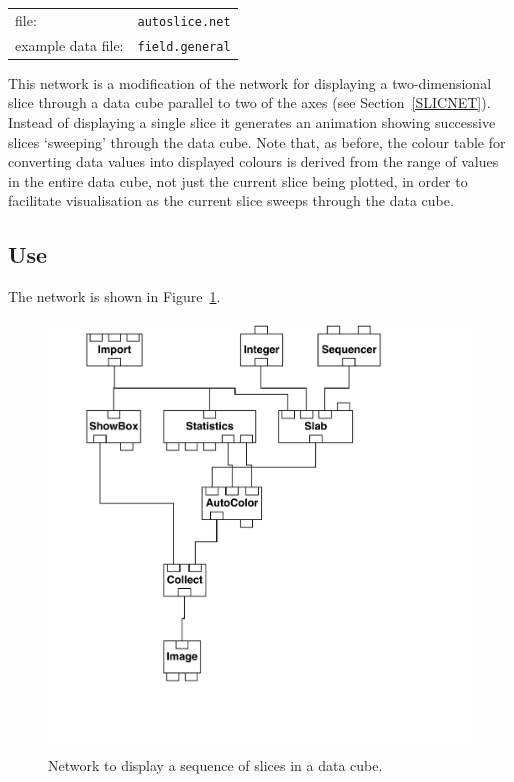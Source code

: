 \documentclass[twoside,11pt]{starlink}
\begin{document}
\begin{tabular}{ll}
file:              & \texttt{autoslice.net} \\
example data file: & \texttt{field.general} \\
\end{tabular}

This network is a modification of the network for displaying a
two-dimensional slice through a data cube parallel to two of the axes
(see Section~\ref{SLICNET}). Instead of displaying a single slice it
generates an animation showing successive slices `sweeping' through the
data cube. Note that, as before, the colour table for converting data
values into displayed colours is derived from the range of values in the
entire data cube, not just the current slice being plotted, in order to
facilitate visualisation as the current slice sweeps through the data
cube.

\subsection{Use}

The network is shown in Figure~\ref{ASLICNETF}.

\begin{figure}[htbp]

\begin{center}
\leavevmode
\includegraphics[width=553pt]{sc2_autoslice}
\end{center}

\caption[Network to display a sequence of slices in a data cube.]{Network
to display a sequence of slices in a data cube. \label{ASLICNETF} }

\end{figure}
\end{document}
